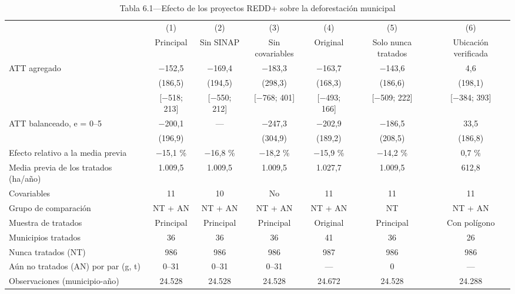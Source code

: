 \begin{table}[htbp]
\centering
\small
\caption{Tabla 6.1—Efecto de los proyectos REDD+ sobre la deforestación municipal}
\label{tab:tabla_6_1}
\begin{threeparttable}
\begin{tabular}{@{}lcccccc@{}}
\toprule
 & (1) & (2) & (3) & (4) & (5) & (6) \\
 & Principal & Sin SINAP & Sin covariables & Original & Solo nunca tratados & Ubicación verificada \\
\midrule
ATT agregado & $-$152,5 & $-$169,4 & $-$183,3 & $-$163,7 & $-$143,6 & 4,6 \\
 & (186,5) & (194,5) & (298,3) & (168,3) & (186,6) & (198,1) \\
 & [$-$518; 213] & [$-$550; 212] & [$-$768; 401] & [$-$493; 166] & [$-$509; 222] & [$-$384; 393] \\
\midrule
ATT balanceado, e = 0--5 & $-$200,1 & — & $-$247,3 & $-$202,9 & $-$186,5 & 33,5 \\
 & (196,9) &  & (304,9) & (189,2) & (208,5) & (186,8) \\
Efecto relativo a la media previa & $-$15,1 \% & $-$16,8 \% & $-$18,2 \% & $-$15,9 \% & $-$14,2 \% & 0,7 \% \\
Media previa de los tratados (ha/año) & 1.009,5 & 1.009,5 & 1.009,5 & 1.027,7 & 1.009,5 & 612,8 \\
\midrule
Covariables & 11 & 10 & No & 11 & 11 & 11 \\
Grupo de comparación & NT + AN & NT + AN & NT + AN & NT + AN & NT & NT + AN \\
Muestra de tratados & Principal & Principal & Principal & Original & Principal & Con polígono \\
Municipios tratados & 36 & 36 & 36 & 41 & 36 & 26 \\
Nunca tratados (NT) & 986 & 986 & 986 & 987 & 986 & 986 \\
Aún no tratados (AN) por par (g, t) & 0--31 & 0--31 & 0--31 & — & 0 & — \\
Observaciones (municipio-año) & 24.528 & 24.528 & 24.528 & 24.672 & 24.528 & 24.288 \\
\bottomrule
\end{tabular}
\begin{tablenotes}[flushleft]
\footnotesize

\end{tablenotes}
\end{threeparttable}
\end{table}
